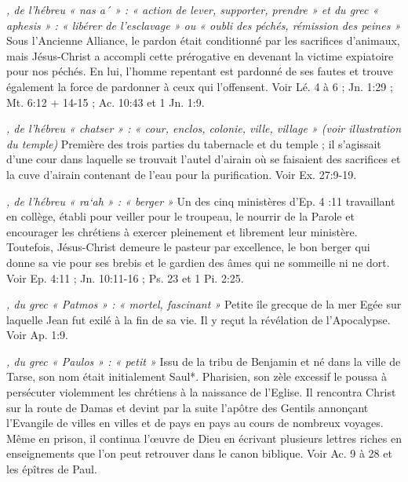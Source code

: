 \begin{multicols}{2}
{\textit{, de l'hébreu « nas a´ » : « action de lever, supporter, prendre » et du grec « aphesis » : « libérer de l'esclavage » ou « oubli des péchés, rémission des peines »}\newline
Sous l'Ancienne Alliance, le pardon était conditionné par les sacrifices d'animaux, mais Jésus-Christ a accompli cette prérogative en devenant la victime expiatoire pour nos péchés. En lui, l'homme repentant est pardonné de ses fautes et trouve également la force de pardonner à ceux qui l'offensent. Voir Lé. 4 à 6 ; Jn. 1:29 ; Mt. 6:12 + 14-15 ; Ac. 10:43 et 1 Jn. 1:9.

\textit{, de l'hébreu « chatser » : « cour, enclos, colonie, ville, village » (voir illustration du temple)}\newline
Première des trois parties du tabernacle et du temple ; il s'agissait d'une cour dans laquelle se trouvait l'autel d'airain où se faisaient des sacrifices et la cuve d'airain contenant de l'eau pour la purification. Voir Ex. 27:9-19.

\textit{, de l'hébreu « ra`ah » : « berger »}\newline
Un des cinq ministères d'Ep. 4 :11 travaillant en collège, établi pour veiller pour le troupeau, le nourrir de la Parole et encourager les chrétiens à exercer pleinement et librement leur ministère. Toutefois, Jésus-Christ demeure le pasteur par excellence, le bon berger qui donne sa vie pour ses brebis et le gardien des âmes qui ne sommeille ni ne dort. Voir Ep. 4:11 ; Jn. 10:11-16 ; Ps. 23 et 1 Pi. 2:25.

\textit{, du grec « Patmos » : « mortel, fascinant »}\newline
Petite île grecque de la mer Egée sur laquelle Jean fut exilé à la fin de sa vie. Il y reçut la révélation de l'Apocalypse. Voir Ap. 1:9.

\textit{, du grec « Paulos » : « petit »}\newline
Issu de la tribu de Benjamin et né dans la ville de Tarse, son nom était initialement Saul*. Pharisien, son zèle excessif le poussa à persécuter violemment les chrétiens à la naissance de l'Eglise. Il rencontra Christ sur la route de Damas et devint par la suite l'apôtre des Gentils annonçant l'Evangile de villes en villes et de pays en pays au cours de nombreux voyages. Même en prison, il continua l'œuvre de Dieu en écrivant plusieurs lettres riches en enseignements que l'on peut retrouver dans le canon biblique. Voir Ac. 9 à 28 et les épîtres de Paul.

}
\end{multicols}
